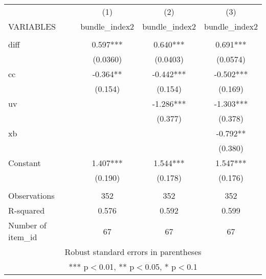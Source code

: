 \begin{tabular}{lccc} \hline
 & (1) & (2) & (3) \\
VARIABLES & bundle\_index2 & bundle\_index2 & bundle\_index2 \\ \hline
 &  &  &  \\
diff & 0.597*** & 0.640*** & 0.691*** \\
 & (0.0360) & (0.0403) & (0.0574) \\
cc & -0.364** & -0.442*** & -0.502*** \\
 & (0.154) & (0.154) & (0.169) \\
uv &  & -1.286*** & -1.303*** \\
 &  & (0.377) & (0.378) \\
xb &  &  & -0.792** \\
 &  &  & (0.380) \\
Constant & 1.407*** & 1.544*** & 1.547*** \\
 & (0.190) & (0.178) & (0.176) \\
 &  &  &  \\
Observations & 352 & 352 & 352 \\
R-squared & 0.576 & 0.592 & 0.599 \\
 Number of item\_id & 67 & 67 & 67 \\ \hline
\multicolumn{4}{c}{ Robust standard errors in parentheses} \\
\multicolumn{4}{c}{ *** p$<$0.01, ** p$<$0.05, * p$<$0.1} \\
\end{tabular}
